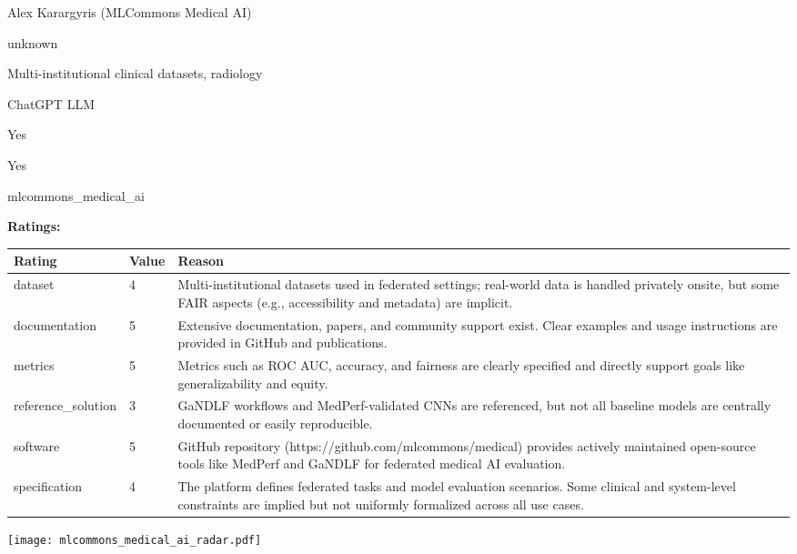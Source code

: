 {{\begin{description}[labelwidth=4cm, labelsep=1em, leftmargin=4cm, itemsep=0.1em, parsep=0em]
  \item[contact.name:] Alex Karargyris (MLCommons Medical AI)
  \item[contact.email:] unknown
  \item[datasets.links.name:] Multi-institutional clinical datasets, radiology
  \item[results.links.name:] ChatGPT LLM
  \item[fair.reproducible:] Yes
  \item[fair.benchmark\_ready:] Yes
  \item[id:] mlcommons\_medical\_ai
  \item[Citations:] \cite{karargyris2023federated}
\end{description}

{\bf Ratings:} ~ \\

\begin{tabular}{p{} p{} p{}}
\hline
Rating & Value & Reason \\
\hline
dataset & 4 & Multi-institutional datasets used in federated settings; real-world data is handled
privately onsite, but some FAIR aspects (e.g., accessibility and metadata) are implicit.
 \\
documentation & 5 & Extensive documentation, papers, and community support exist. Clear examples and usage
instructions are provided in GitHub and publications.
 \\
metrics & 5 & Metrics such as ROC AUC, accuracy, and fairness are clearly specified and directly
support goals like generalizability and equity.
 \\
reference\_solution & 3 & GaNDLF workflows and MedPerf-validated CNNs are referenced, but not all baseline models
are centrally documented or easily reproducible.
 \\
software & 5 & GitHub repository (https://github.com/mlcommons/medical) provides actively maintained
open-source tools like MedPerf and GaNDLF for federated medical AI evaluation.
 \\
specification & 4 & The platform defines federated tasks and model evaluation scenarios. Some clinical and
system-level constraints are implied but not uniformly formalized across all use cases.
 \\
\hline
\end{tabular}

\texttt{[image: mlcommons\_medical\_ai\_radar.pdf]}
}}
\clearpage